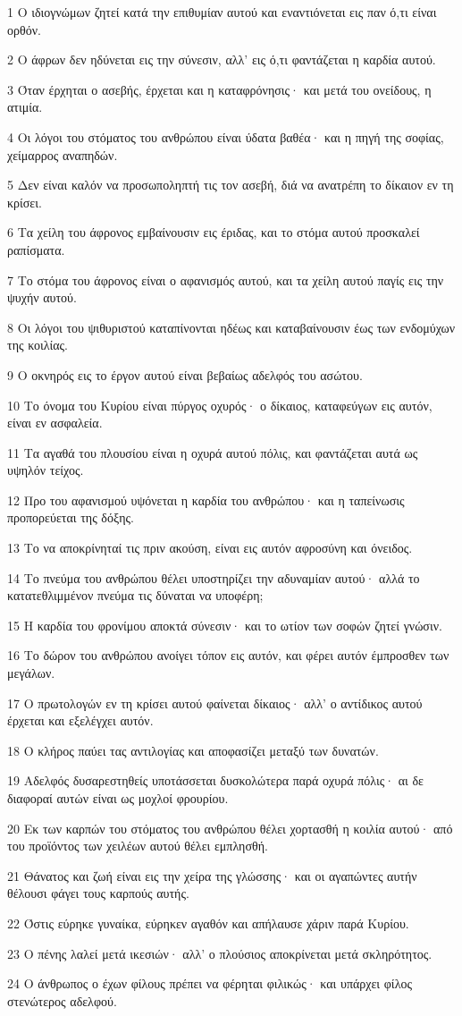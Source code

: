 \par 1 Ο ιδιογνώμων ζητεί κατά την επιθυμίαν αυτού και εναντιόνεται εις παν ό,τι είναι ορθόν.
\par 2 Ο άφρων δεν ηδύνεται εις την σύνεσιν, αλλ' εις ό,τι φαντάζεται η καρδία αυτού.
\par 3 Όταν έρχηται ο ασεβής, έρχεται και η καταφρόνησις· και μετά του ονείδους, η ατιμία.
\par 4 Οι λόγοι του στόματος του ανθρώπου είναι ύδατα βαθέα· και η πηγή της σοφίας, χείμαρρος αναπηδών.
\par 5 Δεν είναι καλόν να προσωποληπτή τις τον ασεβή, διά να ανατρέπη το δίκαιον εν τη κρίσει.
\par 6 Τα χείλη του άφρονος εμβαίνουσιν εις έριδας, και το στόμα αυτού προσκαλεί ραπίσματα.
\par 7 Το στόμα του άφρονος είναι ο αφανισμός αυτού, και τα χείλη αυτού παγίς εις την ψυχήν αυτού.
\par 8 Οι λόγοι του ψιθυριστού καταπίνονται ηδέως και καταβαίνουσιν έως των ενδομύχων της κοιλίας.
\par 9 Ο οκνηρός εις το έργον αυτού είναι βεβαίως αδελφός του ασώτου.
\par 10 Το όνομα του Κυρίου είναι πύργος οχυρός· ο δίκαιος, καταφεύγων εις αυτόν, είναι εν ασφαλεία.
\par 11 Τα αγαθά του πλουσίου είναι η οχυρά αυτού πόλις, και φαντάζεται αυτά ως υψηλόν τείχος.
\par 12 Προ του αφανισμού υψόνεται η καρδία του ανθρώπου· και η ταπείνωσις προπορεύεται της δόξης.
\par 13 Το να αποκρίνηταί τις πριν ακούση, είναι εις αυτόν αφροσύνη και όνειδος.
\par 14 Το πνεύμα του ανθρώπου θέλει υποστηρίζει την αδυναμίαν αυτού· αλλά το κατατεθλιμμένον πνεύμα τις δύναται να υποφέρη;
\par 15 Η καρδία του φρονίμου αποκτά σύνεσιν· και το ωτίον των σοφών ζητεί γνώσιν.
\par 16 Το δώρον του ανθρώπου ανοίγει τόπον εις αυτόν, και φέρει αυτόν έμπροσθεν των μεγάλων.
\par 17 Ο πρωτολογών εν τη κρίσει αυτού φαίνεται δίκαιος· αλλ' ο αντίδικος αυτού έρχεται και εξελέγχει αυτόν.
\par 18 Ο κλήρος παύει τας αντιλογίας και αποφασίζει μεταξύ των δυνατών.
\par 19 Αδελφός δυσαρεστηθείς υποτάσσεται δυσκολώτερα παρά οχυρά πόλις· αι δε διαφοραί αυτών είναι ως μοχλοί φρουρίου.
\par 20 Εκ των καρπών του στόματος του ανθρώπου θέλει χορτασθή η κοιλία αυτού· από του προϊόντος των χειλέων αυτού θέλει εμπλησθή.
\par 21 Θάνατος και ζωή είναι εις την χείρα της γλώσσης· και οι αγαπώντες αυτήν θέλουσι φάγει τους καρπούς αυτής.
\par 22 Όστις εύρηκε γυναίκα, εύρηκεν αγαθόν και απήλαυσε χάριν παρά Κυρίου.
\par 23 Ο πένης λαλεί μετά ικεσιών· αλλ' ο πλούσιος αποκρίνεται μετά σκληρότητος.
\par 24 Ο άνθρωπος ο έχων φίλους πρέπει να φέρηται φιλικώς· και υπάρχει φίλος στενώτερος αδελφού.

